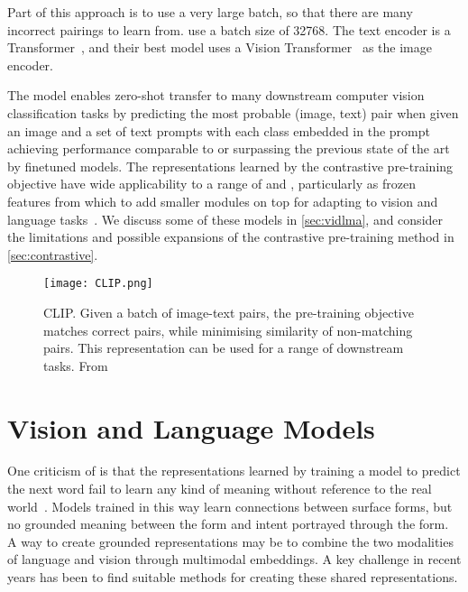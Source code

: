 Part of this approach is to use a very large batch, so that there are many
incorrect pairings to learn from. \citet{radford2021clip} use a batch size of
32768. The text encoder is a Transformer~\citep{vaswani2017attention}, and
their best model uses a Vision Transformer~\citep{dosovitskiy2021vit} as the
image encoder.

The model enables zero-shot transfer to many downstream computer vision
classification tasks by predicting the most probable (image, text) pair when
given an image and a set of text prompts with each class embedded in the prompt
achieving performance comparable to or surpassing the previous state of the art
by finetuned models. The representations learned by the contrastive
pre-training objective have wide applicability to a range of 
and , particularly as frozen features from which to add
smaller modules on top for adapting to vision and language
tasks~\citep{alayrac2022flamingo,lin2022evl,luo2022clip4clip}. We discuss some
of these models in \cref{sec:vidlma}, and consider the limitations and possible
expansions of the contrastive pre-training method in \cref{sec:contrastive}.

\begin{figure}[tp]
	\centering
	\texttt{[image: CLIP.png]}
	\caption{CLIP. Given a batch of image-text pairs, the pre-training
	objective matches correct pairs, while minimising similarity of
	non-matching pairs. This representation can be used for a range of
	downstream tasks. From~\citet{radford2021clip}}
	\label{fig:clip}
\end{figure}


\section{Vision and Language Models}
\label{sec:vlm}

One criticism of  is that the representations learned by
training a model to predict the next word fail to learn any kind of meaning
without reference to the real world~\citep{bender2020climbing}. Models trained
in this way learn connections between surface forms, but no grounded meaning
between the form and intent portrayed through the form. A way to create
grounded representations may be to combine the two modalities of language and
vision through multimodal embeddings. A key challenge in recent years has been
to find suitable methods for creating these shared representations.

